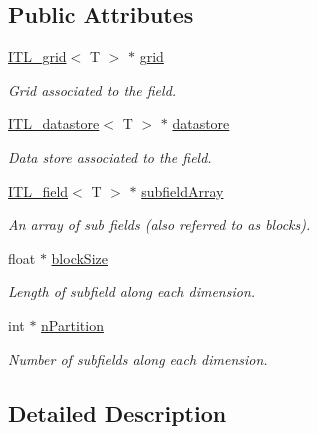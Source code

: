 \subsection*{Public Attributes}
\begin{DoxyCompactItemize}
\item 
\hyperlink{classITL__grid}{ITL\_\-grid}$<$ T $>$ $\ast$ \hyperlink{classITL__field_a6c1bd62b59c41067f23f70ee2dc8a25a}{grid}
\begin{DoxyCompactList}\small\item\em Grid associated to the field. \item\end{DoxyCompactList}\item 
\hyperlink{classITL__datastore}{ITL\_\-datastore}$<$ T $>$ $\ast$ \hyperlink{classITL__field_aab9c6cdf9f4a7f3cd338e92c1dad9931}{datastore}
\begin{DoxyCompactList}\small\item\em Data store associated to the field. \item\end{DoxyCompactList}\item 
\hyperlink{classITL__field}{ITL\_\-field}$<$ T $>$ $\ast$ \hyperlink{classITL__field_a1ade5ffd6676a8df656447ce8512c75e}{subfieldArray}
\begin{DoxyCompactList}\small\item\em An array of sub fields (also referred to as blocks). \item\end{DoxyCompactList}\item 
float $\ast$ \hyperlink{classITL__field_a705d31afd5f130e8d977a0b7aab68fec}{blockSize}
\begin{DoxyCompactList}\small\item\em Length of subfield along each dimension. \item\end{DoxyCompactList}\item 
int $\ast$ \hyperlink{classITL__field_ac5ed068558f49ef1a7113f576e4adfc6}{nPartition}
\begin{DoxyCompactList}\small\item\em Number of subfields along each dimension. \item\end{DoxyCompactList}\end{DoxyCompactItemize}


\subsection{Detailed Description}
